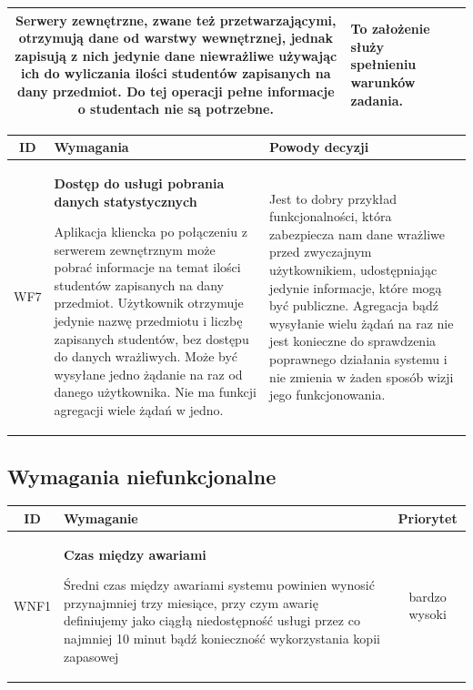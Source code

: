 {\begin{tabularx}{\textwidth}{|c|X|X|}
  Serwery zewnętrzne, zwane też przetwarzającymi, otrzymują dane od warstwy wewnętrznej, jednak zapisują z nich jedynie dane niewrażliwe używając ich do wyliczania ilości studentów zapisanych na dany przedmiot. Do tej operacji pełne informacje o studentach nie są potrzebne. & 
To założenie służy spełnieniu warunków zadania. \\
\hline

\end{tabularx}
\newpage
\begin{tabularx}{\textwidth}{|c|X|X|}
\hline
\textbf{ID} & \textbf{Wymagania}  & \textbf{Powody decyzji} \\
\hline

\label{z:WF7} WF7 & \textbf{Dostęp do usługi pobrania danych statystycznych} 
 
Aplikacja kliencka po połączeniu z serwerem zewnętrznym może pobrać informacje na temat ilości studentów zapisanych na dany przedmiot. Użytkownik otrzymuje jedynie nazwę przedmiotu i liczbę zapisanych studentów, bez dostępu do danych wrażliwych. Może być wysyłane jedno żądanie na raz od danego użytkownika. Nie ma funkcji agregacji wiele żądań w jedno. & 
Jest to dobry przykład funkcjonalności, która zabezpiecza nam dane wrażliwe przed zwyczajnym użytkownikiem, udostępniając jedynie informacje, które mogą być publiczne. Agregacja bądź wysyłanie wielu żądań na raz nie jest konieczne do sprawdzenia poprawnego działania systemu i nie zmienia w żaden sposób wizji jego funkcjonowania.\\
\hline



\end{tabularx}

\subsection[Wymagania niefunkcjonalne]{Wymagania niefunkcjonalne}


\begin{tabularx}{\textwidth}{|c|X|c|}
\hline
\textbf{ID} & \textbf{Wymaganie}  & \textbf{Priorytet} \\
\hline

\label{z:WNF1} WNF1 & \textbf{Czas między awariami} 
 
Średni czas między awariami systemu powinien wynosić przynajmniej trzy miesiące, przy czym awarię definiujemy jako ciągłą niedostępność usługi przez co najmniej 10 minut bądź konieczność wykorzystania kopii zapasowej
 & bardzo wysoki\\
\hline


\end{tabularx}}
